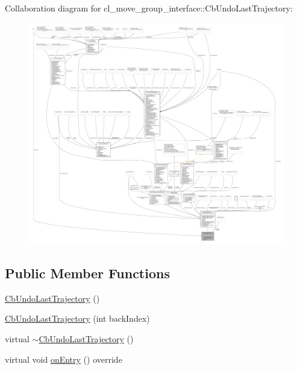 Collaboration diagram for cl\+\_\+move\+\_\+group\+\_\+interface\+:\+:Cb\+Undo\+Last\+Trajectory\+:
\nopagebreak
\begin{figure}[H]
\begin{center}
\leavevmode
\includegraphics[width=350pt]{classcl__move__group__interface_1_1CbUndoLastTrajectory__coll__graph}
\end{center}
\end{figure}
\subsection*{Public Member Functions}
\begin{DoxyCompactItemize}
\item 
\hyperlink{classcl__move__group__interface_1_1CbUndoLastTrajectory_a34c62fa8199c8f6f748096d6dfb51501}{Cb\+Undo\+Last\+Trajectory} ()
\item 
\hyperlink{classcl__move__group__interface_1_1CbUndoLastTrajectory_ac3f88bd21cb4055247826dec09b19424}{Cb\+Undo\+Last\+Trajectory} (int back\+Index)
\item 
virtual \hyperlink{classcl__move__group__interface_1_1CbUndoLastTrajectory_ac9d4a399a0f10fb46e49c919649e52c6}{$\sim$\+Cb\+Undo\+Last\+Trajectory} ()
\item 
virtual void \hyperlink{classcl__move__group__interface_1_1CbUndoLastTrajectory_a3c55fa93ff65d8eccb8cc14a420cb7b2}{on\+Entry} () override
\end{DoxyCompactItemize}
